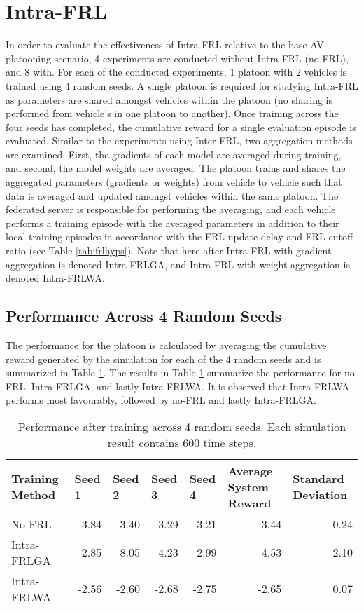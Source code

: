 \section{Intra-FRL}
In order to evaluate the effectiveness of Intra-FRL relative to the base AV platooning
scenario, 4 experiments are conducted without Intra-FRL (no-FRL), and 8 with.  For each of
the conducted experiments, 1 platoon with 2 vehicles is trained using 4 random seeds.  A
single platoon is required for studying Intra-FRL as parameters are shared amongst
vehicles within the platoon (no sharing is performed from vehicle's in one platoon to
another).  Once training across the four seeds has completed, the cumulative reward for
a single evaluation episode is evaluated.  Similar to the experiments using Inter-FRL,
two aggregation methods are examined.  First, the gradients of each model are averaged
during training, and second, the model weights are averaged.  The platoon trains and
shares the aggregated parameters (gradients or weights) from vehicle to vehicle such
that data is averaged and updated amongst vehicles within the same platoon. The federated
server is responsible for performing the averaging, and each vehicle performs a training
episode with the averaged parameters in addition to their local training episodes in
accordance with the FRL update delay and FRL cutoff ratio (see Table \ref{tab:frlhyps}).
Note that here-after Intra-FRL with gradient aggregation is denoted Intra-FRLGA, and
Intra-FRL with weight aggregation is denoted Intra-FRLWA.


\subsection{Performance Across 4 Random Seeds}
The performance for the platoon is calculated by averaging the cumulative reward generated
by the simulation for each of the 4 random seeds and is summarized in Table
\ref{tab:intrafrl-summary}. The results in Table \ref{tab:intrafrl-summary} summarize
the performance for no-FRL, Intra-FRLGA, and lastly Intra-FRLWA.  It is observed that
Intra-FRLWA performs most favourably, followed by no-FRL and lastly Intra-FRLGA.


\begin{table}[H]
  \centering
  \scriptsize
  \caption{Performance after training across 4 random seeds. Each simulation result contains 600 time steps.}
    \begin{tabular}{lrrrrrr} \toprule
    \textbf{Training Method} & \multicolumn{1}{l}{\textbf{Seed 1}} & \multicolumn{1}{l}{\textbf{Seed 2}} & \multicolumn{1}{l}{\textbf{Seed 3}} & \multicolumn{1}{l}{\textbf{Seed 4}} & \multicolumn{1}{l}{\textbf{Average System Reward}} & \multicolumn{1}{l}{\textbf{Standard Deviation}} \\ \midrule
    No-FRL & -3.84 & -3.40 & -3.29 & -3.21 & -3.44 & 0.24 \\
    Intra-FRLGA & -2.85 & -8.05 & -4.23 & -2.99 & -4.53 & 2.10 \\
    Intra-FRLWA & -2.56 & -2.60 & -2.68 & -2.75 & -2.65 & 0.07 \\ \bottomrule
    \end{tabular}%
  \label{tab:intrafrl-summary}%
\end{table}%

